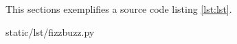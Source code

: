 This sections exemplifies a source code listing \ref{lst:lst}.

\begin{center}
  
    {static/lst/fizzbuzz.py}
\end{center}